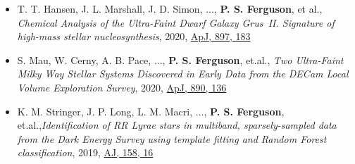 \begin{itemize}[itemsep=1pt]
    \item T. T. Hansen, J. L. Marshall, J. D. Simon, ..., \textbf{P. S. Ferguson}, et al., \textit{Chemical Analysis of the Ultra-Faint Dwarf Galaxy Grus~II. Signature of high-mass stellar nucleosynthesis}, 2020, \href{https://doi.org/10.3847/1538-4357/ab9643}{ApJ, 897, 183}
    
    \item S. Mau, W. Cerny, A. B. Pace, ..., \textbf{P. S. Ferguson}, et.al., \textit{Two Ultra-Faint Milky Way Stellar Systems Discovered in Early Data from the DECam Local Volume Exploration Survey}, 2020, \href{https://doi.org/10.3847/1538-4357/ab6c67}{ApJ, 890, 136}
    
    \item K. M. Stringer, J. P. Long, L. M. Macri, ..., \textbf{P. S. Ferguson}, et.al.,\textit{Identification of RR Lyrae stars in multiband, sparsely-sampled data from the Dark Energy Survey using template fitting and Random Forest classification}, 2019, \href{https://doi.org/10.3847/1538-3881/ab1f46}{AJ, 158, 16}

\end{itemize}
